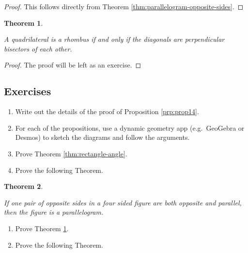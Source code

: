 \documentclass[
]{book}
\newtheorem{theorem}{Theorem}[chapter]
\theoremstyle{definition}
\theoremstyle{definition}
\theoremstyle{definition}
\theoremstyle{definition}
\theoremstyle{remark}
\begin{document}
\begin{proof}

This follows directly from Theorem \ref{thm:parallelogram-opposite-sides}.

\end{proof}

\begin{theorem}
\protect\hypertarget{thm:rhombus-diagonals}{}\label{thm:rhombus-diagonals}

A quadrilateral is a rhombus if and only if the diagonals are perpendicular bisectors of each other.

\end{theorem}

\begin{proof}

The proof will be left as an exercise.

\end{proof}

\hypertarget{exercises-39}{%
\subsection{Exercises}\label{exercises-39}}

\begin{enumerate}
\def\labelenumi{\arabic{enumi}.}
\item
  Write out the details of the proof of Proposition \ref{prp:prop14}.
\item
  For each of the propositions, use a dynamic geometry app (e.g.~GeoGebra or Desmos) to sketch the diagrams and follow the arguments.
\item
  Prove Theorem \ref{thm:rectangle-angle}.
\item
  Prove the following Theorem.
\end{enumerate}

\begin{theorem}
\protect\hypertarget{thm:unlabeled-div-175}{}\label{thm:unlabeled-div-175}

If one pair of opposite sides in a four sided figure are both opposite and parallel, then the figure is a parallelogram.

\end{theorem}

\begin{enumerate}
\def\labelenumi{\arabic{enumi}.}
\item
  Prove Theorem \ref{thm:rhombus-diagonals}.
\item
  Prove the following Theorem.
\end{enumerate}
\end{document}
